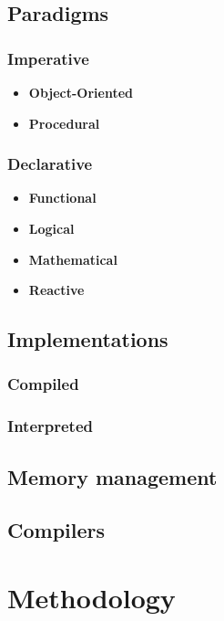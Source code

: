 ﻿\documentclass[10pt,a4paper,twocolumn,twoside]{article}
\begin{document}
\subsection{Paradigms}
\subsubsection{Imperative}
\begin{itemize}
    \item \textbf{Object-Oriented}\\
    \item \textbf{Procedural}\\
\end{itemize}

\subsubsection{Declarative}
\begin{itemize}
    \item \textbf{Functional}\\
    \item \textbf{Logical}\\
    \item \textbf{Mathematical}\\
    \item \textbf{Reactive}\\
\end{itemize}

\subsection{Implementations}
\subsubsection{Compiled}
\subsubsection{Interpreted}

\subsection{Memory management}

\subsection{Compilers}

\section{Methodology}
\end{document}

